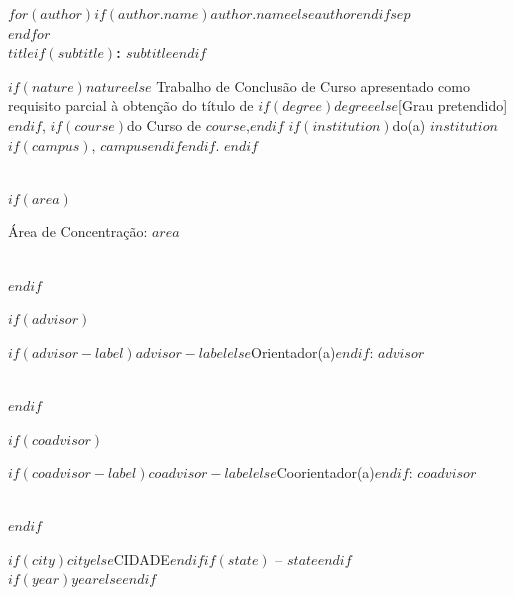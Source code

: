 \documentclass[
  12pt,
  oneside,
  a4paper,
  chapter=TITLE,
  english,
  $if(lang)$$lang$$else$portuguese$endif$
]{abntex2}
\begin{document}
\begin{folhaderosto}
  \center

  {\ABNTEXchapterfont\bfseries\large
    $for(author)$$if(author.name)$\MakeUppercase{$author.name$}$else$\MakeUppercase{$author$}$endif$$sep$\\$endfor$
  }\\[15\baselineskip]

  {\ABNTEXchapterfont\bfseries\large
    \MakeUppercase{$title$}$if(subtitle)$: $subtitle$$endif$
  }\\[2cm]

  \hspace*{8cm}
  \parbox{8cm}{\normalsize\setlength{\parskip}{0pt}\setlength{\parindent}{0pt}\normalfont
    $if(nature)$$nature$$else$%
      Trabalho de Conclusão de Curso apresentado como requisito parcial
      à obtenção do título de
      $if(degree)$$degree$$else$[Grau pretendido]$endif$,
      $if(course)$do Curso de $course$,$endif$
      $if(institution)$do(a) $institution$$if(campus)$, $campus$$endif$$endif$.
    $endif$
  }\\[0.8cm]

  $if(area)$
  \hspace*{8cm}
  \parbox{8cm}{\normalsize\normalfont
    Área de Concentração: $area$
  }\\[0.5cm]
  $endif$

  $if(advisor)$
  \hspace*{8cm}
  \parbox{8cm}{\normalsize\normalfont
    $if(advisor-label)$$advisor-label$$else$Orientador(a)$endif$: $advisor$
  }\\[0.5cm]
  $endif$

  $if(coadvisor)$
  \hspace*{8cm}
  \parbox{8cm}{\normalsize\normalfont
    $if(coadvisor-label)$$coadvisor-label$$else$Coorientador(a)$endif$: $coadvisor$
  }\\[0.5cm]
  $endif$

  \vfill

  {\ABNTEXchapterfont\large
    \MakeUppercase{$if(city)$$city$$else$CIDADE$endif$}$if(state)$ -- $state$$endif$\\
    $if(year)$$year$$else$\the\year$endif$
  }
\end{folhaderosto}
\end{document}
